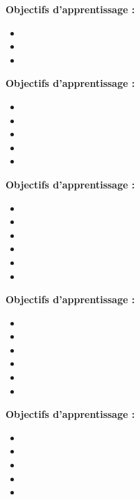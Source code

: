 \par\noindent\textbf{Objectifs d'apprentissage :}
\begin{itemize}
    \item \useobj[C4B1da]
    \item \useobj[C4B1ea]
    \item \useobj[C4B1ei]
\end{itemize}
\endsequence

\par\noindent\textbf{Objectifs d'apprentissage :}
\begin{itemize}
    \item \useobj[C4A1da]
    \item \useobj[C4A1db]
    \item \useobj[C4A1dc]
    \item \useobj[C4A1dd]
    \item \useobj[C4A1de]
\end{itemize}
\endsequence

\par\noindent\textbf{Objectifs d'apprentissage :}
\begin{itemize}
    \item \useobj[C4A1df]
    \item \useobj[C4A1ea]
    \item \useobj[C4A1eb]
    \item \useobj[C4A1ec]
    \item \useobj[C4A1ed]
    \item \useobj[C4A1ef]
\end{itemize}
\endsequence

\par\noindent\textbf{Objectifs d'apprentissage :}
\begin{itemize}
    \item \useobj[C4B1be]
    \item \useobj[C4B1ed]
    \item \useobj[C4B1ee]
    \item \useobj[C4B1ef]
    \item \useobj[C4B1eh]
    \item \useobj[C4B1fh]
\end{itemize}
\endsequence

\par\noindent\textbf{Objectifs d'apprentissage :}
\begin{itemize}
    \item \useobj[C4D1aa]
    \item \useobj[C4D1ab]
    \item \useobj[C4D1ac]
    \item \useobj[C4D1ad]
    \item \useobj[C4D1ae]
\end{itemize}
\endsequence

